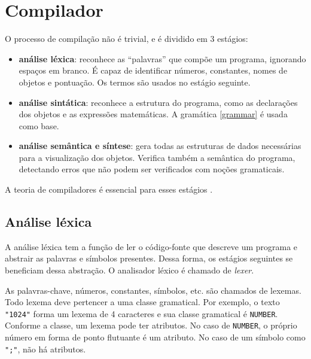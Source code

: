 \chapter{Compilador}
\label{comp}


O processo de compilação não é trivial, e é dividido em 3 estágios:
\begin{itemize}
    \item \textbf{análise léxica}: reconhece as ``palavras'' que compõe um programa,
    ignorando espaços em branco. É capaz de identificar números, 
    constantes, nomes de objetos e pontuação.
    Os termos são usados no estágio seguinte.

    \item \textbf{análise sintática}: reconhece a estrutura do programa, como
    as declarações dos objetos e as expressões matemáticas.
    A gramática \ref{grammar} é usada como base.

    \item \textbf{análise semântica e síntese}: gera todas as estruturas de dados
    necessárias para a visualização dos objetos.
    Verifica também a semântica do programa,
    detectando erros que não podem ser verificados com noções gramaticais.
\end{itemize}

A teoria de compiladores é essencial para esses estágios \cite{Dragon:1}.

\newpage

\section{Análise léxica}
A análise léxica tem a função de ler o código-fonte que descreve um programa
e abstrair as palavras e símbolos presentes.
Dessa forma, os estágios seguintes se beneficiam dessa abstração.
O analisador léxico é chamado de \textit{lexer}.

As palavras-chave, números, constantes, símbolos, etc. são chamados de lexemas.
Todo lexema deve pertencer a uma classe gramatical.
Por exemplo, o texto \texttt{"1024"} forma um lexema de 4 caracteres
e sua classe gramatical é \texttt{NUMBER}.
Conforme a classe, um lexema pode ter atributos.
No caso de \texttt{NUMBER}, o próprio número em forma de ponto flutuante é um atributo.
No caso de um símbolo como \texttt{";"}, não há atributos.

